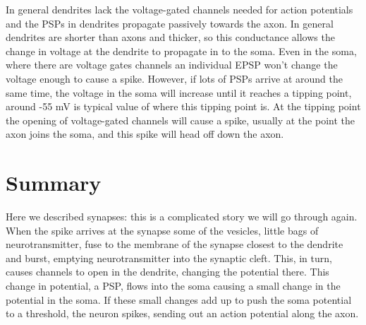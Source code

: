 \documentclass[12pt]{article}
\begin{document}
In general dendrites lack the voltage-gated channels needed for action
potentials and the PSPs in dendrites propagate passively towards the
axon. In general dendrites are shorter than axons and thicker, so this
conductance allows the change in voltage at the dendrite to propagate
in to the soma. Even in the soma, where there are voltage gates
channels an individual EPSP won't change the voltage enough to cause a
spike. However, if lots of PSPs arrive at around the same time, the
voltage in the soma will increase until it reaches a tipping point,
around -55 mV is typical value of where this tipping point is. At the tipping point
the opening of voltage-gated channels will cause a spike, usually at
the point the axon joins the soma, and this spike will head off down
the axon.

\section{Summary}

Here we described synapses: this is a complicated story we will go
through again. When the spike arrives at the synapse some of the
vesicles, little bags of neurotransmitter, fuse to the membrane of the
synapse closest to the dendrite and burst, emptying neurotransmitter
into the synaptic cleft. This, in turn, causes channels to open in the
dendrite, changing the potential there. This change in potential, a
PSP, flows into the soma causing a small change in the potential in
the soma. If these small changes add up to push the soma potential to
a threshold, the neuron spikes, sending out an action potential along
the axon.



{}
\end{document}
